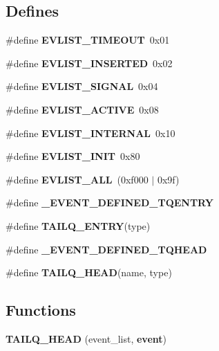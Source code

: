 \subsection*{\-Defines}
\begin{DoxyCompactItemize}
\item 
\#define {\bfseries \-E\-V\-L\-I\-S\-T\-\_\-\-T\-I\-M\-E\-O\-U\-T}~0x01\label{event__struct_8h_afd2b522123bb498e82f0cba3154c96bf}

\item 
\#define {\bfseries \-E\-V\-L\-I\-S\-T\-\_\-\-I\-N\-S\-E\-R\-T\-E\-D}~0x02\label{event__struct_8h_a1e4e9dd49bfbb4cccc279d653263bf0d}

\item 
\#define {\bfseries \-E\-V\-L\-I\-S\-T\-\_\-\-S\-I\-G\-N\-A\-L}~0x04\label{event__struct_8h_a105489ac55c9ced60e0ce20af2024f2a}

\item 
\#define {\bfseries \-E\-V\-L\-I\-S\-T\-\_\-\-A\-C\-T\-I\-V\-E}~0x08\label{event__struct_8h_aceaf2fdd81437ac1daebde3c023cbd62}

\item 
\#define {\bfseries \-E\-V\-L\-I\-S\-T\-\_\-\-I\-N\-T\-E\-R\-N\-A\-L}~0x10\label{event__struct_8h_a27a22542705d3dd63e32d5681da2bfb3}

\item 
\#define {\bfseries \-E\-V\-L\-I\-S\-T\-\_\-\-I\-N\-I\-T}~0x80\label{event__struct_8h_aed6bac1f3d7c88dae44e82ff987729a9}

\item 
\#define {\bfseries \-E\-V\-L\-I\-S\-T\-\_\-\-A\-L\-L}~(0xf000 $|$ 0x9f)\label{event__struct_8h_a1322cc51314cd035cfae7e568d7214e5}

\item 
\#define {\bfseries \-\_\-\-E\-V\-E\-N\-T\-\_\-\-D\-E\-F\-I\-N\-E\-D\-\_\-\-T\-Q\-E\-N\-T\-R\-Y}\label{event__struct_8h_a1c5d5563dbaafdae9e5337ce227beb71}

\item 
\#define {\bfseries \-T\-A\-I\-L\-Q\-\_\-\-E\-N\-T\-R\-Y}(type)
\item 
\#define {\bfseries \-\_\-\-E\-V\-E\-N\-T\-\_\-\-D\-E\-F\-I\-N\-E\-D\-\_\-\-T\-Q\-H\-E\-A\-D}\label{event__struct_8h_a6c7fb7582946a9439bc1498ef9dbd4c3}

\item 
\#define {\bfseries \-T\-A\-I\-L\-Q\-\_\-\-H\-E\-A\-D}(name, type)
\end{DoxyCompactItemize}
\subsection*{\-Functions}
\begin{DoxyCompactItemize}
\item 
{\bfseries \-T\-A\-I\-L\-Q\-\_\-\-H\-E\-A\-D} (event\-\_\-list, {\bf event})\label{event__struct_8h_a45136c02c5f04444bfa4b01e390b46c8}

\end{DoxyCompactItemize}


